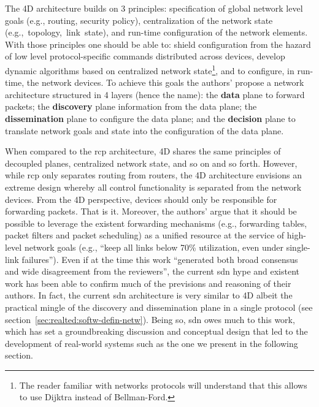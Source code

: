 The 4D architecture builds on 3 principles: specification of global network level goals (e.g., routing, security policy),  centralization of the network state \mbox{(e.g.,\ topology, link state),} and run-time configuration  of the network elements. 
With those principles one should be able to: shield configuration from the hazard of low level protocol-specific commands distributed across devices, develop dynamic algorithms based on centralized network state\footnote{The reader familiar with networks protocols will  understand that this allows to use Dijktra instead of Bellman-Ford.}, and  to configure, in run-time, the network devices.  
To achieve this goals the authors' propose a network architecture structured in 4 layers (hence the name): the \textbf{data} plane to forward packets; the \textbf{discovery} plane information from the data plane; the \textbf{dissemination}  plane to configure the data plane; and the \textbf{decision} plane to translate network goals and state into the configuration of the data plane. 

When compared to the \gls{rcp} architecture, 4D shares the same principles of decoupled planes, centralized network state, and so on and so forth. 
However, while \gls{rcp} only separates routing from routers, the 4D architecture envisions an extreme design whereby all control functionality is separated from the network devices. From the 4D perspective, devices should only be responsible for forwarding packets. That is it. Moreover, the authors' argue that it should be possible to leverage the existent forwarding mechanisms (e.g., forwarding tables, packet filters and packet scheduling) as a unified resource at the service of high-level network goals  (e.g., ``keep all links below 70\% utilization, even under single-link failures'').
Even if at the time this work ``generated both broad consensus and wide disagreement from the reviewers'', the current \gls{sdn} hype and existent work has been able to confirm much of the previsions and reasoning of their authors. 
In fact, the current \gls{sdn} architecture is very similar to 4D albeit the practical mingle of the discovery and dissemination plane in a single protocol (see section~\ref{sec:realted:softw-defin-netw}). Being so, \gls{sdn} owes much to this work, which has set a groundbreaking discussion and conceptual design that led to the development of real-world systems such as the one we present in the following section.  

